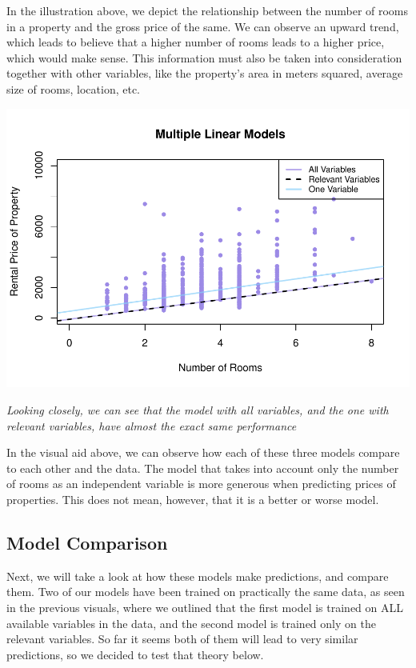 \documentclass[
]{article}
\begin{document}
In the illustration above, we depict the relationship between the number
of rooms in a property and the gross price of the same. We can observe
an upward trend, which leads to believe that a higher number of rooms
leads to a higher price, which would make sense. This information must
also be taken into consideration together with other variables, like the
property's area in meters squared, average size of rooms, location, etc.

\includegraphics{2024_groupXX_report_files/figure-latex/3LM Plots-1.pdf}

\emph{Looking closely, we can see that the model with all variables, and
the one with relevant variables, have almost the exact same performance}

In the visual aid above, we can observe how each of these three models
compare to each other and the data. The model that takes into account
only the number of rooms as an independent variable is more generous
when predicting prices of properties. This does not mean, however, that
it is a better or worse model.

\subsection{Model Comparison}\label{model-comparison}

Next, we will take a look at how these models make predictions, and
compare them. Two of our models have been trained on practically the
same data, as seen in the previous visuals, where we outlined that the
first model is trained on ALL available variables in the data, and the
second model is trained only on the relevant variables. So far it seems
both of them will lead to very similar predictions, so we decided to
test that theory below.
\end{document}
